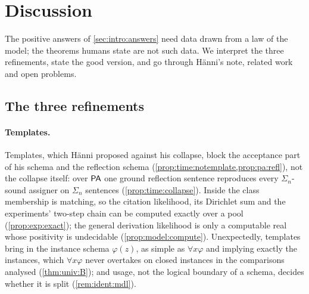 
\section{Discussion}\label{sec:disc}

The positive answers of \cref{sec:intro:answers} need data drawn from a law of the model; the theorems humans state are not such data. We interpret the three refinements, state the good version, and go through H\"anni's note, related work and open problems.

\subsection{The three refinements}\label{sec:disc:proposal}

\paragraph{Templates.} Templates, which H\"anni proposed against his collapse, block the acceptance part of his schema and the reflection schema (\cref{prop:time:notemplate,prop:pa:refl}), not the collapse itself: over $\mathsf{PA}$ one ground reflection sentence reproduces every $\Sigma_n$-sound assigner on $\Sigma_n$ sentences (\cref{prop:time:collapse}). Inside the class membership is matching, so the citation likelihood, its Dirichlet sum and the experiments' two-step chain can be computed exactly over a pool (\cref{prop:exp:exact}); the general derivation likelihood is only a computable real whose positivity is undecidable (\cref{prop:model:compute}). Unexpectedly, templates bring in the instance schema $\varphi(z)$, as simple as $\forall x\varphi$ and implying exactly the instances, which $\forall x\varphi$ never overtakes on closed instances in the comparisons analysed (\cref{thm:univ:B}); and usage, not the logical boundary of a schema, decides whether it is split (\cref{rem:ident:mdl}).

